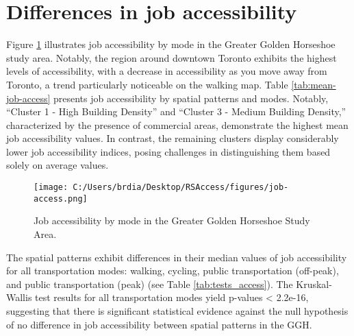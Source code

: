 \documentclass[conference,final,]{IEEEtran}
\begin{document}
\hypertarget{differences-in-job-accessibility}{%
\section{Differences in job
accessibility}\label{differences-in-job-accessibility}}

Figure \ref{fig:map_jobs} illustrates job accessibility by mode in the
Greater Golden Horseshoe study area. Notably, the region around downtown
Toronto exhibits the highest levels of accessibility, with a decrease in
accessibility as you move away from Toronto, a trend particularly
noticeable on the walking map. Table \ref{tab:mean-job-access} presents
job accessibility by spatial patterns and modes. Notably, ``Cluster 1 -
High Building Density'' and ``Cluster 3 - Medium Building Density,''
characterized by the presence of commercial areas, demonstrate the
highest mean job accessibility values. In contrast, the remaining
clusters display considerably lower job accessibility indices, posing
challenges in distinguishing them based solely on average values.

\begin{table}[!ht]
\centering
\caption{Mean values for job accessibility by spatial pattern and mode of transport}
\label{tab:mean-job-access}
\end{table}

\begin{figure}[!ht]
\centering
\texttt{[image: C:/Users/brdia/Desktop/RSAccess/figures/job-access.png]}
\caption{Job accessibility by mode in the Greater Golden Horseshoe Study Area.}
\label{fig:map_jobs}
\end{figure}

The spatial patterns exhibit differences in their median values of job
accessibility for all transportation modes: walking, cycling, public
transportation (off-peak), and public transportation (peak) (see Table
\ref{tab:tests_access}). The Kruskal-Wallis test results for all
transportation modes yield p-values \textless{} 2.2e-16, suggesting that
there is significant statistical evidence against the null hypothesis of
no difference in job accessibility between spatial patterns in the GGH.
\end{document}
